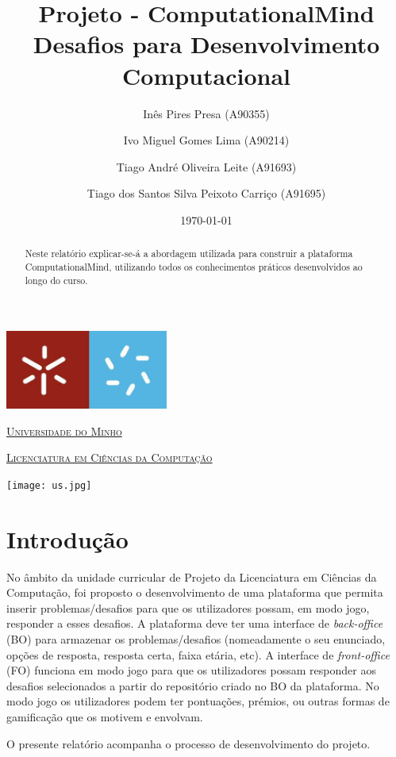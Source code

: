 \documentclass[11pt,a4paper]{report}
\title{Projeto - ComputationalMind\\ Desafios para Desenvolvimento  Computacional} %
\author{Inês Pires Presa (A90355)\and Ivo Miguel Gomes Lima (A90214)\and Tiago André Oliveira Leite (A91693)\and Tiago dos Santos Silva Peixoto Carriço (A91695)} %
\date{\today} %
\begin{document}
\clearpage
\thispagestyle{empty}

  \begin{minipage}{0.9\linewidth}
        \centering
    \includegraphics[width=0.4\textwidth]{um.jpeg}\par\vspace{1cm}
                \href{https://www.uminho.pt/PT}
    {\scshape\LARGE Universidade do Minho} \par
    \vspace{0.6cm}
                \href{https://lcc.di.uminho.pt}
    {\scshape\Large Licenciatura em Ciências da Computação} \par
    \maketitle
    \begin{center}
      \texttt{[image: us.jpg]}
\end{center}
  \end{minipage}

\begin{abstract}  %
Neste relatório explicar-se-á a abordagem utilizada para construir a plataforma ComputationalMind, utilizando todos os conhecimentos práticos desenvolvidos ao longo do curso.
\end{abstract}

\tableofcontents %

\chapter{Introdução}

No âmbito da unidade curricular de Projeto da Licenciatura em Ciências da Computação, foi proposto o desenvolvimento de uma plataforma que permita inserir problemas/desafios para que os utilizadores possam, em modo jogo, responder a esses desafios. A plataforma deve ter uma interface de \emph{back-office} (BO) para armazenar os problemas/desafios (nomeadamente o seu enunciado, opções de resposta, resposta certa, faixa etária, etc). 
A interface de \emph{front-office} (FO) funciona em modo jogo para que os utilizadores possam responder aos desafios selecionados a partir do repositório criado no BO da plataforma. No modo jogo os utilizadores podem ter pontuações, prémios, ou outras formas de gamificação que os motivem e envolvam. \par
O presente relatório acompanha o processo de desenvolvimento do projeto.
\end{document}
